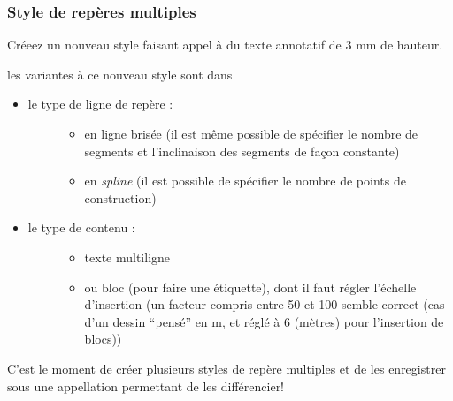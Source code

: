\documentclass[a4paper,12pt,french]{sphinxmanual}
\begin{document}
\subsubsection{Style de repères multiples}
\label{acad/config_acad:style-de-reperes-multiples}
Créeez un nouveau style faisant appel à du texte annotatif de 3 mm de hauteur.

les variantes à ce nouveau style sont dans
\begin{itemize}
\item {} \begin{description}
\item[{le type de ligne de repère :}] \leavevmode\begin{itemize}
\item {} 
en ligne brisée (il est même possible de spécifier le nombre de segments et l'inclinaison des segments de façon constante)

\item {} 
en \emph{spline} (il est possible de spécifier le nombre de points de construction)

\end{itemize}

\end{description}

\item {} \begin{description}
\item[{le type de contenu :}] \leavevmode\begin{itemize}
\item {} 
texte multiligne

\item {} 
ou bloc (pour faire une étiquette), dont il faut régler l'échelle d'insertion (un facteur compris entre 50 et 100 semble correct (cas d'un dessin ``pensé'' en m, et réglé à 6 (mètres) pour l'insertion de blocs))

\end{itemize}

\end{description}

\end{itemize}

C'est le moment de créer plusieurs styles de repère multiples et de les enregistrer sous une appellation permettant de les différencier!
\begin{figure}[htbp]
\centering

\noindent{}
\end{figure}
\end{document}
